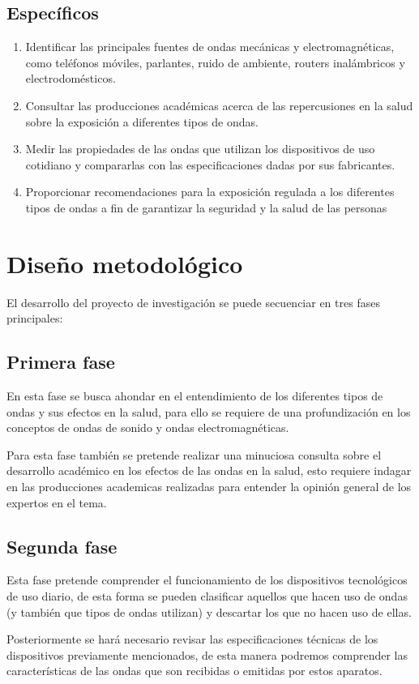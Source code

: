 \documentclass[spanish,notitlepage,letterpaper, 12pt]{article}
\begin{document}
\subsection{Específicos}
\begin{enumerate}
    \item Identificar las principales fuentes de ondas mecánicas y electromagnéticas, como teléfonos móviles, parlantes, ruido de ambiente, routers inalámbricos y electrodomésticos.
    \item Consultar las producciones académicas acerca de las repercusiones en la salud sobre la exposición a diferentes tipos de ondas.
    \item Medir las propiedades de las ondas que utilizan los dispositivos de uso cotidiano y compararlas con las especificaciones dadas por sus fabricantes.
    \item Proporcionar recomendaciones para la exposición regulada a los diferentes tipos de ondas a fin de garantizar la seguridad y la salud de las personas
\end{enumerate}
\section{Diseño metodológico}
El desarrollo del proyecto de investigación se puede secuenciar en tres fases principales:
\subsection{Primera fase}
En esta fase se busca ahondar en el entendimiento de los diferentes tipos de ondas y sus efectos en la salud, para ello se requiere de una profundización en los conceptos de ondas de sonido y ondas electromagnéticas.\par
\bigskip
Para esta fase también se pretende realizar una minuciosa consulta sobre el desarrollo académico en los efectos de las ondas en la salud, esto requiere indagar en las producciones academicas realizadas para entender la opinión general de los expertos en el tema.

\subsection{Segunda fase}
Esta fase pretende comprender el funcionamiento de los dispositivos tecnológicos de uso diario, de esta forma se pueden clasificar aquellos que hacen uso de ondas (y también que tipos de ondas utilizan) y descartar los que no hacen uso de ellas.\par
\bigskip
Posteriormente se hará necesario revisar las especificaciones técnicas de los dispositivos previamente mencionados, de esta manera podremos comprender las características de las ondas que son recibidas o emitidas por estos aparatos.
\end{document}
